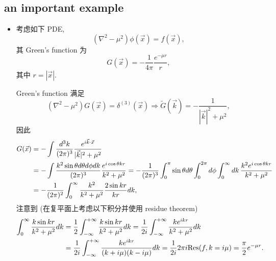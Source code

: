 \subsection{an important example} \label{subsection Dirac delta function & Fourier transformation.2.1}
\begin{itemize}
	\item 考虑如下 PDE,
	\begin{equation}
		(\nabla^2 - \mu^2) \phi(\vec{x}) = f(\vec{x}),
	\end{equation}
	其 Green's function 为
	\begin{equation}
		G(\vec{x}) = - \frac{1}{4 \pi} \frac{e^{- \mu r}}{r},
	\end{equation}
	其中 $r = |\vec{x}|$.
	
	\begin{tcolorbox}[title=calculation:]
		Green's function 满足
		\begin{equation}
			(\nabla^2 - \mu^2) G(\vec{x}) = \delta^{(3)}(\vec{x}) \Longrightarrow \tilde{G}(\vec{k}) = - \frac{1}{|\vec{k}|^2 + \mu^2},
		\end{equation}
		因此
		\begin{align}
			G(\vec{x}) &= - \int \frac{d^3 k}{(2 \pi)^3} \frac{e^{i \vec{k} \cdot \vec{x}}}{|\vec{k}|^2 + \mu^2} \notag \\
			&= - \int \frac{k^2 \sin \theta d\theta d\phi dk}{(2 \pi)^3} \frac{e^{i \cos \theta k r}}{k^2 + \mu^2} = - \frac{1}{(2 \pi)^3} \int_0^\pi \sin \theta d\theta \int_0^{2 \pi} d\phi \int_0^\infty dk \, \frac{k^2 e^{i \cos \theta k r}}{k^2 + \mu^2} \notag \\
			&= - \frac{1}{(2 \pi)^2} \int_0^\infty \frac{k^2}{k^2 + \mu^2} \frac{2 \sin k r}{k r} dk,
		\end{align}
		注意到 (在复平面上考虑以下积分并使用 residue theorem)
		\begin{align}
			\int_0^\infty \frac{k \sin k r}{k^2 + \mu^2} dk &= \frac{1}{2} \int_{- \infty}^{+ \infty} \frac{k \sin k r}{k^2 + \mu^2} dk = \frac{1}{2 i} \int_{- \infty}^{+ \infty} \frac{k e^{i k r}}{k^2 + \mu^2} dk \notag \\
			&= \frac{1}{2 i} \int_{- \infty}^{+ \infty} \frac{k e^{i k r}}{(k + i \mu) (k - i \mu)} dk = \frac{1}{2 i} 2 \pi i \mathrm{Res}(f, k = i \mu) = \frac{\pi}{2} e^{- \mu r}.
		\end{align}
	\end{tcolorbox}
\end{itemize}
